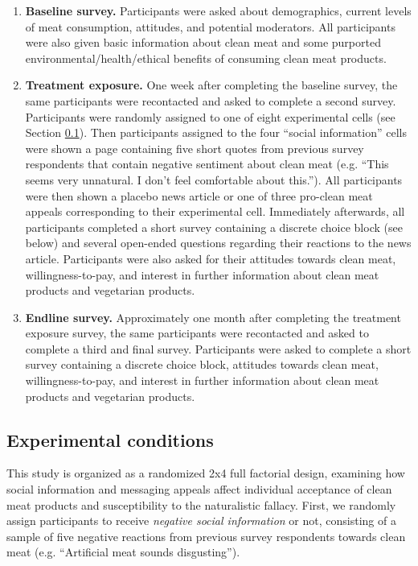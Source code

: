\documentclass[12pt]{article}
\begin{document}
\begin{enumerate}
    \item \textbf{Baseline survey.} Participants were asked about demographics, current levels of meat consumption, attitudes, and potential moderators. All participants were also given basic information about clean meat and some purported environmental/health/ethical benefits of consuming clean meat products.
    
    \item \textbf{Treatment exposure.} One week after completing the baseline survey, the same participants were recontacted and asked to complete a second survey. Participants were randomly assigned to one of eight experimental cells (see Section \ref{ssec:arms}). Then participants assigned to the four ``social information'' cells were shown a page containing five short quotes from previous survey respondents that contain negative sentiment about clean meat (e.g. ``This seems very unnatural. I don't feel comfortable about this.''). All participants were then shown a placebo news article or one of three pro-clean meat appeals corresponding to their experimental cell. Immediately afterwards, all participants completed a short survey containing a discrete choice block (see below) and several open-ended questions regarding their reactions to the news article. Participants were also asked for their attitudes towards clean meat, willingness-to-pay, and interest in further information about clean meat products and vegetarian products.
    
    \item \textbf{Endline survey.} Approximately one month after completing the treatment exposure survey, the same participants were recontacted and asked to complete a third and final survey. Participants were asked to complete a short survey containing a discrete choice block, attitudes towards clean meat, willingness-to-pay, and interest in further information about clean meat products and vegetarian products.
\end{enumerate}

\subsection{Experimental conditions}
\label{ssec:arms}

This study is organized as a randomized 2x4 full factorial design, examining how social information and messaging appeals affect individual acceptance of clean meat products and susceptibility to the naturalistic fallacy. First, we randomly assign participants to receive \textit{negative social information} or not, consisting of a sample of five negative reactions from previous survey respondents towards clean meat (e.g. ``Artificial meat sounds disgusting''). 
\end{document}
